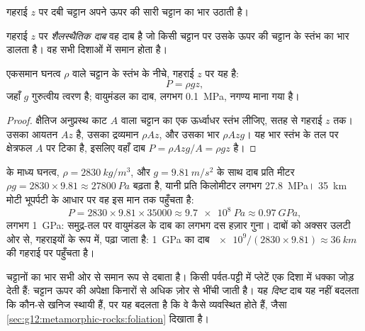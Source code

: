 गहराई $z$ पर दबी चट्टान अपने ऊपर की सारी चट्टान का भार उठाती है।

\begin{definition}[शैलस्थैतिक दाब]\label{def:g12:metamorphic-rocks:lithostatic}
गहराई $z$ पर \emph{शैलस्थैतिक दाब}
वह दाब है जो किसी चट्टान पर उसके ऊपर की चट्टान के स्तंभ का भार डालता
है। वह सभी दिशाओं में समान होता है।
\end{definition}

\begin{proposition}[शैलस्थैतिक दाब]\label{prop:g12:metamorphic-rocks:lithostatic}
एकसमान घनत्व $\rho$ वाले चट्टान के स्तंभ के नीचे, 
गहराई $z$ पर यह है:
\[
  P = \rho g z ,
\]
जहाँ $g$ गुरुत्वीय त्वरण है; वायुमंडल का
दाब, लगभग \qty{0.1}{MPa}, नगण्य माना गया है।
\end{proposition}

\begin{proof}
क्षैतिज अनुप्रस्थ काट $A$ वाला चट्टान का एक ऊर्ध्वाधर स्तंभ लीजिए, सतह से
गहराई $z$ तक। उसका आयतन $Az$ है, उसका द्रव्यमान $\rho A z$, और
उसका भार $\rho A z g$। यह भार स्तंभ के तल पर क्षेत्रफल $A$ पर टिका है,
इसलिए वहाँ दाब $P = \rho A z g / A = \rho g z$ है।
\end{proof}

 के माध्य घनत्व, $\rho = \qty{2830}{kg/m^3}$,
और $g = \qty{9.81}{m/s^2}$ के साथ दाब प्रति मीटर $\rho g = 2830 \times 9.81
\approx \qty{27800}{Pa}$ बढ़ता है, यानी प्रति किलोमीटर लगभग \qty{27.8}{MPa}।
\qty{35}{km} मोटी भूपर्पटी के आधार पर वह इस मान तक पहुँचता है:
\[
  P = 2830 \times 9.81 \times \num{35000} \approx \qty{9.7e8}{Pa} \approx
  \qty{0.97}{GPa},
\]
लगभग \qty{1}{GPa}: समुद्र-तल पर वायुमंडल के दाब का लगभग दस हज़ार गुना।
दाबों को अक्सर उलटी ओर से, गहराइयों के रूप में, पढ़ा जाता है:
\qty{1}{GPa} का दाब $\num{e9}/(2830 \times 9.81) \approx \qty{36}{km}$ की
गहराई पर पहुँचता है।

चट्टानों का भार सभी ओर से समान रूप से दबाता है। किसी पर्वत-पट्टी में
प्लेटें एक दिशा में धक्का जोड़ देती हैं: चट्टान ऊपर की अपेक्षा किनारों से
अधिक ज़ोर से भींची जाती है। यह \emph{दिष्ट} दाब यह नहीं बदलता कि कौन-से
खनिज स्थायी हैं, पर यह बदलता है कि वे कैसे व्यवस्थित होते हैं, जैसा
\cref{sec:g12:metamorphic-rocks:foliation} दिखाता है।

